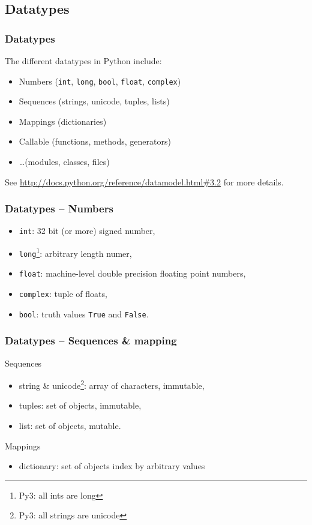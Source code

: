 \documentclass[xetex,10pt]{beamer}
\def\pythoni{\lstinline[language=pythontim]}
\def\spacer{\vspace*{1em}}
\newcommand{\pypypy}[1]{\footnote[frame]{Py3: #1}}
\begin{document}
\subsection{Datatypes}

\begin{frame}[fragile]
	\frametitle{Datatypes}
	
	The different datatypes in Python include:
	\spacer
	\begin{itemize}
		\item Numbers (\pythoni{int}, \pythoni{long}, \pythoni{bool}, \pythoni{float}, \pythoni{complex})
		\item Sequences (strings,  unicode, tuples, lists)
		\item Mappings (dictionaries)
		\item Callable (functions, methods, generators)
		\item \ldots (modules, classes, files)
	\end{itemize}
	
	\spacer
	See \url{http://docs.python.org/reference/datamodel.html\#3.2} for more details.
\end{frame}

\begin{frame}[fragile]
	\frametitle{Datatypes -- Numbers}

	\begin{itemize}
		\item \pythoni{int}: 32 bit (or more) signed number,
		\item \pythoni{long}\pypypy{all ints are long}: arbitrary length numer,
		\item \pythoni{float}: machine-level double precision floating point numbers,
		\item \pythoni{complex}: tuple of floats,
		\item \pythoni{bool}: truth values \pythoni{True} and \pythoni{False}.
	\end{itemize}
\end{frame}

\begin{frame}[fragile]
	\frametitle{Datatypes -- Sequences \& mapping}
	
	Sequences
	\begin{itemize}
		\item string \& unicode\pypypy{all strings are unicode}: array of characters, immutable,
		\item tuples: set of objects, immutable,
		\item list: set of objects, mutable.
	\end{itemize}
	\spacer
	Mappings
	\begin{itemize}
		\item dictionary: set of objects index by arbitrary values
	\end{itemize}
\end{frame}
\end{document}
